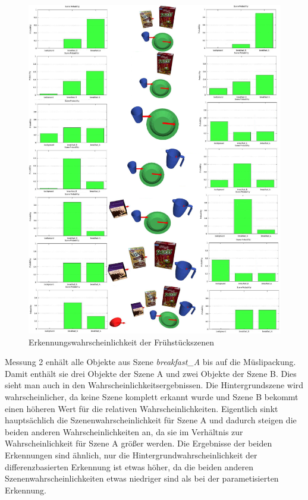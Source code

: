 \begin{figure}
	\centering
	\includegraphics[width=15cm]{bilder/evaluationfruehstueckszenen.pdf}
	\caption{Erkennungswahrscheinlichkeit der Fr{\"u}hst{\"u}ckszenen \cite{gassner17}}
	\label{img:fruehstueck}
\end{figure}
Messung 2 enhält alle Objekte aus Szene \textit{breakfast\_A} bis auf die Müslipackung. Damit enthält sie drei Objekte der Szene A und zwei Objekte der Szene B. Dies sieht man auch in den Wahrscheinlichkeitsergebnissen. Die Hintergrundszene wird wahrscheinlicher, da keine Szene komplett erkannt wurde und  Szene B bekommt einen höheren Wert für die relativen Wahrscheinlichkeiten. Eigentlich sinkt hauptsächlich die Szenenwahrscheinlichkeit für Szene A und dadurch steigen die beiden anderen Wahrscheinlichkeiten an, da sie im Verhältnis zur Wahrscheinlichkeit für Szene A größer werden. Die Ergebnisse der beiden Erkennungen sind ähnlich, nur die Hintergrundwahrscheinlichkeit der differenzbasierten Erkennung ist etwas höher, da die beiden anderen Szenenwahrscheinlichkeiten etwas niedriger sind als bei der parametisierten Erkennung.\smallskip\\

